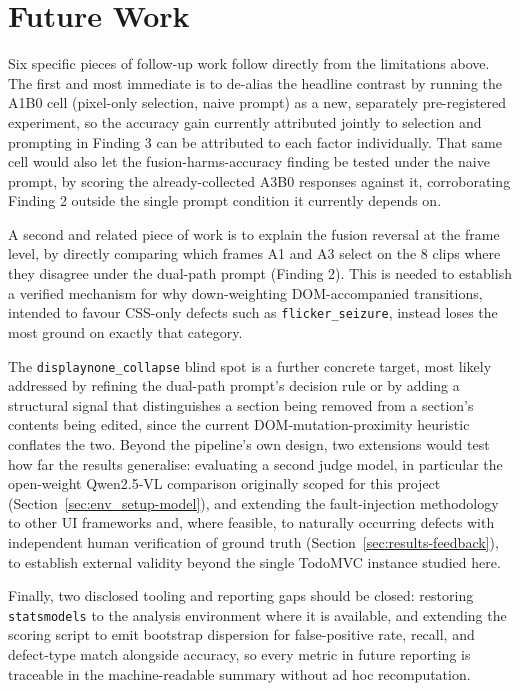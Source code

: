 \section{Future Work}
Six specific pieces of follow-up work follow directly from the limitations above. The first and most immediate is to de-alias the headline contrast by running the A1B0 cell (pixel-only selection, naive prompt) as a new, separately pre-registered experiment, so the accuracy gain currently attributed jointly to selection and prompting in Finding 3 can be attributed to each factor individually. That same cell would also let the fusion-harms-accuracy finding be tested under the naive prompt, by scoring the already-collected A3B0 responses against it, corroborating Finding 2 outside the single prompt condition it currently depends on.

A second and related piece of work is to explain the fusion reversal at the frame level, by directly comparing which frames A1 and A3 select on the 8 clips where they disagree under the dual-path prompt (Finding 2). This is needed to establish a verified mechanism for why down-weighting DOM-accompanied transitions, intended to favour CSS-only defects such as \texttt{flicker\_seizure}, instead loses the most ground on exactly that category.

The \texttt{displaynone\_collapse} blind spot is a further concrete target, most likely addressed by refining the dual-path prompt's decision rule or by adding a structural signal that distinguishes a section being removed from a section's contents being edited, since the current DOM-mutation-proximity heuristic conflates the two. Beyond the pipeline's own design, two extensions would test how far the results generalise: evaluating a second judge model, in particular the open-weight Qwen2.5-VL comparison originally scoped for this project (Section~\ref{sec:env_setup-model}), and extending the fault-injection methodology to other UI frameworks and, where feasible, to naturally occurring defects with independent human verification of ground truth (Section~\ref{sec:results-feedback}), to establish external validity beyond the single TodoMVC instance studied here.

Finally, two disclosed tooling and reporting gaps should be closed: restoring \texttt{statsmodels} to the analysis environment where it is available, and extending the scoring script to emit bootstrap dispersion for false-positive rate, recall, and defect-type match alongside accuracy, so every metric in future reporting is traceable in the machine-readable summary without ad hoc recomputation.

